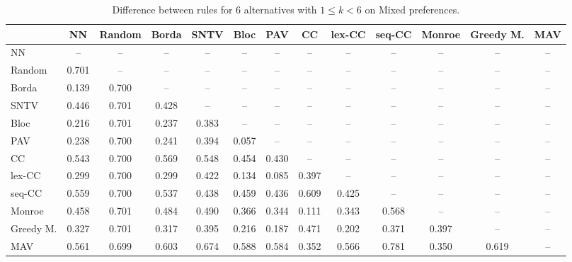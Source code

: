 
\begin{table*}[h!]
\centering
\begin{tabular}{lcccccccccccc}
\toprule
 & NN & Random & Borda & SNTV & Bloc & PAV & CC & lex-CC & seq-CC & Monroe & Greedy M. & MAV \\
\midrule
NN & -- & -- & -- & -- & -- & -- & -- & -- & -- & -- & -- & -- \\
Random & 0.701 & -- & -- & -- & -- & -- & -- & -- & -- & -- & -- & -- \\
Borda & 0.139 & 0.700 & -- & -- & -- & -- & -- & -- & -- & -- & -- & -- \\
SNTV & 0.446 & 0.701 & 0.428 & -- & -- & -- & -- & -- & -- & -- & -- & -- \\
Bloc & 0.216 & 0.701 & 0.237 & 0.383 & -- & -- & -- & -- & -- & -- & -- & -- \\
PAV & 0.238 & 0.700 & 0.241 & 0.394 & 0.057 & -- & -- & -- & -- & -- & -- & -- \\
CC & 0.543 & 0.700 & 0.569 & 0.548 & 0.454 & 0.430 & -- & -- & -- & -- & -- & -- \\
lex-CC & 0.299 & 0.700 & 0.299 & 0.422 & 0.134 & 0.085 & 0.397 & -- & -- & -- & -- & -- \\
seq-CC & 0.559 & 0.700 & 0.537 & 0.438 & 0.459 & 0.436 & 0.609 & 0.425 & -- & -- & -- & -- \\
Monroe & 0.458 & 0.701 & 0.484 & 0.490 & 0.366 & 0.344 & 0.111 & 0.343 & 0.568 & -- & -- & -- \\
Greedy M. & 0.327 & 0.701 & 0.317 & 0.395 & 0.216 & 0.187 & 0.471 & 0.202 & 0.371 & 0.397 & -- & -- \\
MAV & 0.561 & 0.699 & 0.603 & 0.674 & 0.588 & 0.584 & 0.352 & 0.566 & 0.781 & 0.350 & 0.619 & -- \\
\bottomrule
\end{tabular}

\caption{Difference between rules for 6 alternatives with $1 \leq k < 6$ on Mixed preferences.}
\end{table*}

